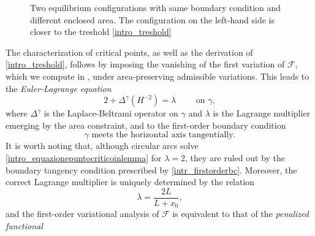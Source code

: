 \documentclass[11pt]{amsart}
\newcommand{\F}{\mathcal F}
\newcommand{\G}{\mathbb{G}}
\renewcommand{\k}{\kappa}
\newcommand{\ga}{\gamma}
\theoremstyle{definition}
\theoremstyle{remark}
\numberwithin{equation}{section}
\begin{document}
\begin{figure}[h!]
		\caption{Two equilibrium configurations with same boundary condition and different enclosed area. The configuration on the left-hand side is closer to the treshold \eqref{intro_treshold}}
		\label{fig:curve}
	\end{figure}
\bigskip
	 The characterization of critical points, as well as the derivation of \eqref{intro_treshold}, follows by imposing the vanishing of the first variation of $\F$, which we compute in , under area-preserving admissible variations. This leads to the \emph{Euler-Lagrange equation}
	\begin{equation}\label{intro_equazionepuntocriticoinlemma}
		2+\Delta^\gamma(H^{-2})=\lambda\qquad\text{ on $\gamma$},
	\end{equation}
	where $\Delta^\gamma$ is the Laplace-Beltrami operator on $\ga$ and $\lambda$ is the Lagrange multiplier emerging by the area constraint, and to the first-order boundary condition \begin{equation}\label{intr_firstorderbc}
		\gamma\text{ meets the horizontal axis tangentially}.
	\end{equation}
	It is worth noting that, although circular arcs solve \eqref{intro_equazionepuntocriticoinlemma} for $\lambda=2$, they are ruled out by the boundary tangency condition prescribed by \eqref{intr_firstorderbc}. 
	Moreover, the correct Lagrange multiplier is uniquely determined by the relation 
	\begin{equation}\label{intr_lagmolt}
		\lambda=\frac{2L}{L+x_0},
	\end{equation}
	and the first-order variational analysis of $\F$ is equivalent to that of the \emph{penalized functional}
\end{document}
